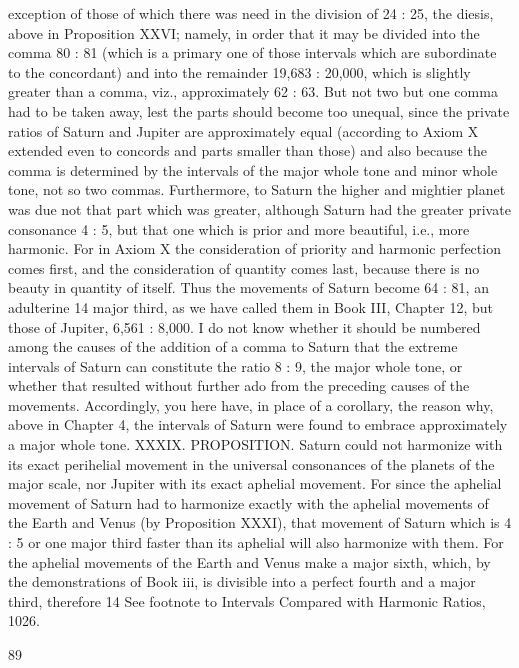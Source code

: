\documentclass{article}
\begin{document}
exception of those of which there was need in the division of 24 : 25, the
diesis, above in Proposition XXVI; namely, in order that it may be
divided into the comma 80 : 81 (which is a primary one of those intervals
which are subordinate to the concordant) and into the remainder 19,683
: 20,000, which is slightly greater than a comma, viz., approximately 62 :
63. But not two but one comma had to be taken away, lest the parts
should become too unequal, since the private ratios of Saturn and
Jupiter are approximately equal (according to Axiom X extended even to
concords and parts smaller than those) and also because the comma is
determined by the intervals of the major whole tone and minor whole
tone, not so two commas. Furthermore, to Saturn the higher and
mightier planet was due not that part which was greater, although
Saturn had the greater private consonance 4 : 5, but that one which is
prior and more beautiful, i.e., more harmonic. For in Axiom X the
consideration of priority and harmonic perfection comes first, and the
consideration of quantity comes last, because there is no beauty in
quantity of itself. Thus the movements of Saturn become 64 : 81, an
adulterine 14 major third, as we have called them in Book III, Chapter 12,
but those of Jupiter, 6,561 : 8,000.
I do not know whether it should be numbered among the causes of the
addition of a comma to Saturn that the extreme intervals of Saturn can
constitute the ratio 8 : 9, the major whole tone, or whether that resulted
without further ado from the preceding causes of the movements.
Accordingly, you here have, in place of a corollary, the reason why, above
in Chapter 4, the intervals of Saturn were found to embrace
approximately a major whole tone.
XXXIX. PROPOSITION. Saturn could not harmonize with its exact
perihelial movement in the universal consonances of the planets of the
major scale, nor Jupiter with its exact aphelial movement.
For since the aphelial movement of Saturn had to harmonize exactly with
the aphelial movements of the Earth and Venus (by Proposition XXXI),
that movement of Saturn which is 4 : 5 or one major third faster than its
aphelial will also harmonize with them. For the aphelial movements of
the Earth and Venus make a major sixth, which, by the demonstrations
of Book iii, is divisible into a perfect fourth and a major third, therefore
14 See footnote to Intervals Compared with Harmonic Ratios, 1026.


89
\end{document}
